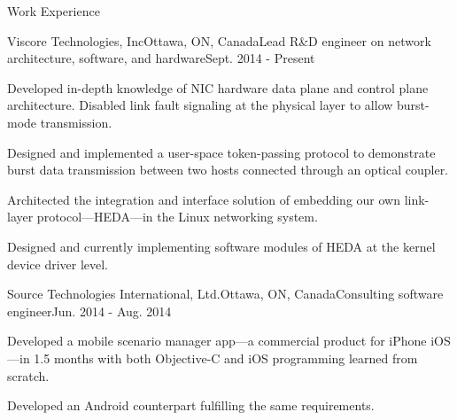 \documentclass{resume} %
\begin{document}

\begin{rSection}{Work Experience}

\begin{rSubsection}{Viscore Technologies, Inc}{Ottawa, ON, Canada}{Lead R\&D engineer on network architecture, software, and hardware}{Sept. 2014 - Present}
\item Developed in-depth knowledge of NIC hardware data plane and control plane architecture. Disabled link fault signaling at the physical layer to allow burst-mode transmission.
\item Designed and implemented a user-space token-passing protocol to demonstrate burst data transmission between two hosts connected through an optical coupler.
\item Architected the integration and interface solution of embedding our own link-layer protocol---HEDA---in the Linux networking system.
\item Designed and currently implementing software modules of HEDA at the kernel device driver level.
\end{rSubsection}


\begin{rSubsection}{Source Technologies International, Ltd.}{Ottawa, ON, Canada}{Consulting software engineer}{Jun. 2014 - Aug. 2014}
\item Developed a mobile scenario manager app---a commercial product for iPhone iOS---in 1.5 months with both Objective-C and iOS programming learned from scratch.
\item Developed an Android counterpart fulfilling the same requirements.
\end{rSubsection}

\end{rSection}
\end{document}
